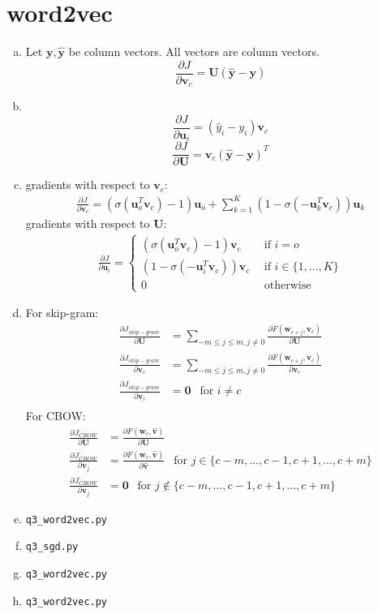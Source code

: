\documentclass[11pt]{article}
\newcommand{\pder}[2][]{\frac{\partial#1}{\partial#2}}
\begin{document}
\section{word2vec}
\label{sec:3}

\begin{enumerate}[(a)]
\item Let $\bm{y}, \hat{\bm{y}}$ be column vectors. All vectors are column vectors.
  \[
    \pder[J]{\bm{v}_c} = \bm{U}(\hat{\bm{y}} - \bm{y})
  \]
  
\item \
  \[
    \pder[J]{\bm{u}_i} = (\hat{y}_i - y_i)\bm{v}_c
  \]
  \[
    \pder[J]{\bm{U}} = \bm{v}_c(\hat{\bm{y}} - \bm{y})^T
  \]
  
\item gradients with respect to $\bm{v}_c$:
  \begin{align*}
    \pder[J]{\bm{v}_c} = (\sigma(\bm{u}_o^T\bm{v}_c) - 1)\bm{u}_o + \sum_{k=1}^K (1 - \sigma(-\bm{u}_k^T\bm{v}_c))\bm{u}_k
  \end{align*}
  gradients with respect to $\bm{U}$:
  \begin{align*}
    \pder[J]{\bm{u}_i} =
    \begin{cases}
      (\sigma(\bm{u}_o^T\bm{v}_c) - 1)\bm{v}_c \ \ &\mbox{if } i = o \\
       (1 - \sigma(-\bm{u}_i^T\bm{v}_c))\bm{v}_c \ \ &\mbox{if } i \in \{1,\dots, K\} \\
      0 \ \ & \mbox{otherwise}
    \end{cases}
  \end{align*}
  
  
\item For skip-gram:
  \begin{align*}
    \pder[J_{skip-gram}]{\bm{U}} &= \sum_{-m \leq j\leq m, j\neq 0} \pder[F(\bm{w}_{c+j}, \bm{v}_c)]{\bm{U}} \\
    \pder[J_{skip-gram}]{\bm{v}_c} &= \sum_{-m \leq j\leq m, j\neq 0} \pder[F(\bm{w}_{c+j}, \bm{v}_c)]{\bm{v}_c} \\
    \pder[J_{skip-gram}]{\bm{v}_i} &= \bm{0} \ \ \text{ for } i \neq c\\
  \end{align*}
  For CBOW:
  \begin{align*}
    \pder[J_{CBOW}]{\bm{U}} &= \pder[F(\bm{w}_c, \hat{\bm{v}})]{\bm{U}} \\
    \pder[J_{CBOW}]{\bm{v}_{j}} &= \pder[F(\bm{w}_c, \hat{\bm{v}})]{\hat{\bm{v}}} \ \ \text{ for } j \in \{c-m, ..., c-1, c+1, ..., c+m \} \\
    \pder[J_{CBOW}]{\bm{v}_{j}} &= \bm{0} \ \ \text{ for } j \notin \{c-m, ..., c-1, c+1, ..., c+m \}
  \end{align*}
\item \verb|q3_word2vec.py|
\item \verb|q3_sgd.py|
\item \verb|q3_word2vec.py|
\item \verb|q3_word2vec.py|
\end{enumerate}
\end{document}
